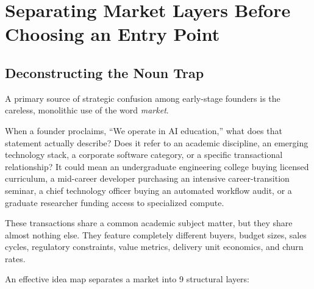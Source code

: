 \section{Separating Market Layers Before Choosing an Entry Point}

\subsection{Deconstructing the Noun Trap}

A primary source of strategic confusion among early-stage founders is the careless, monolithic use of the word \textit{market}.

When a founder proclaims, ``We operate in AI education,'' what does that statement actually describe? Does it refer to an academic discipline, an emerging technology stack, a corporate software category, or a specific transactional relationship? It could mean an undergraduate engineering college buying licensed curriculum, a mid-career developer purchasing an intensive career-transition seminar, a chief technology officer buying an automated workflow audit, or a graduate researcher funding access to specialized compute.

These transactions share a common academic subject matter, but they share almost nothing else. They feature completely different buyers, budget sizes, sales cycles, regulatory constraints, value metrics, delivery unit economics, and churn rates.

An effective idea map separates a market into 9 structural layers:

